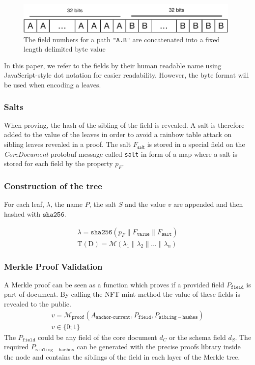 \begin{figure}[ht]
  \centering
  \includegraphics[width=11cm]{img/property_bits.pdf}
  \caption{The field numbers for a path \texttt{"A.B"} are concatenated into a fixed length delimited byte value} 
  \label{img:property_bits}
\end{figure}

In this paper, we refer to the fields by their human readable name using JavaScript-style dot notation for easier readability. However, the byte format will be used when encoding a leaves.


\subsubsection{Salts}
When proving, the hash of the sibling of the field is revealed. A salt is therefore added to the value of the leaves in order to avoid a rainbow table attack on sibling leaves revealed in a proof. The salt $F_{\mathsf{salt}}$ is stored in a special field on the \textit{CoreDocument} protobuf message called \texttt{salt} in form of a map where a salt is stored for each field by the property $p_F$.

\subsubsection{Construction of the tree}
For each leaf, $\lambda$, the name $P$, the salt $S$ and the value $v$ are appended and then hashed with $\mathtt{sha256}$.

\begin{eqnarray}
\lambda = \mathtt{sha256}(p_{F} \parallel F_{\texttt{value}} \parallel	 F_{\texttt{salt}})\\
\mathrm{T}(\mathrm{D}) = \mathcal{M}({\lambda_{1} \parallel \lambda_{2} \parallel ... \parallel \lambda_{n}})
\end{eqnarray}

\subsubsection{Merkle Proof Validation}\label{sec:merkle_proof_validation}
A Merkle proof can be seen as a function which proves if a provided field $P_\mathtt{field}$ is part of document. By calling the NFT mint method the value of these fields is revealed to the public. 
\begin{equation}
\begin{split}
v = \mathcal{M}_{\texttt{proof}}(A_{\texttt{anchor-current}},P_\mathtt{field},P_\mathtt{sibling-hashes}) \\
v \in \{0;1\}
\end{split}
\end{equation}
The $P_\mathtt{field}$  could be any field of the core document $d_C$ or the schema field $d_S$. The required $P_\mathtt{sibling-hashes}$ can be generated with the precise proofs library inside the node and contains the siblings of the field in each layer of the Merkle tree.  